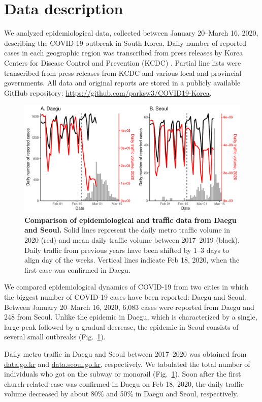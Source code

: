 \documentclass[12pt]{article}
\newcommand{\fref}[1]{Fig.~\ref{fig:#1}}
\begin{document}
\section{Data description}

We analyzed epidemiological data, collected between January 20--March 16, 2020, describing the COVID-19 outbreak in South Korea.
Daily number of reported cases in each geographic region was transcribed from press releases by Korea Centers for Disease Control and Prevention (KCDC) \cite{kcdc}.
Partial line lists were transcribed from press releases from KCDC and various local and provincial governments.
All data and original reports are stored in a publicly available GitHub repository: \url{https://github.com/parksw3/COVID19-Korea}.

\begin{figure}[!h]
\includegraphics[width=\textwidth]{figure_compare_report.pdf}
\caption{
\textbf{Comparison of epidemiological and traffic data from Daegu and Seoul.}
Solid lines represent the daily metro traffic volume in 2020 (red) and mean daily traffic volume between 2017--2019 (black).
Daily traffic from previous years have been shifted by 1--3 days to align day of the weeks.
Vertical lines indicate Feb 18, 2020, when the first case was confirmed in Daegu.
}
\label{fig:data}
\end{figure}

We compared epidemiological dynamics of COVID-19 from two cities in which the biggest number of COVID-19 cases have been reported: Daegu and Seoul.
Between January 20--March 16, 2020, 6,083 cases were reported from Daegu and 248 from Seoul.
Unlike the epidemic in Daegu, which is characterized by a single, large peak followed by a gradual decrease, the epidemic in Seoul consists of several small outbreaks (\fref{data}).

Daily metro traffic in Daegu and Seoul between 2017--2020 was obtained from \url{data.go.kr} and \url{data.seoul.go.kr}, respectively.
We tabulated the total number of individuals who got on the subway or monorail (\fref{data}).
Soon after the first church-related case was confirmed in Daegu on Feb 18, 2020, the daily traffic volume decreased by about 80\% and 50\% in Daegu and Seoul, respectively.
\end{document}
